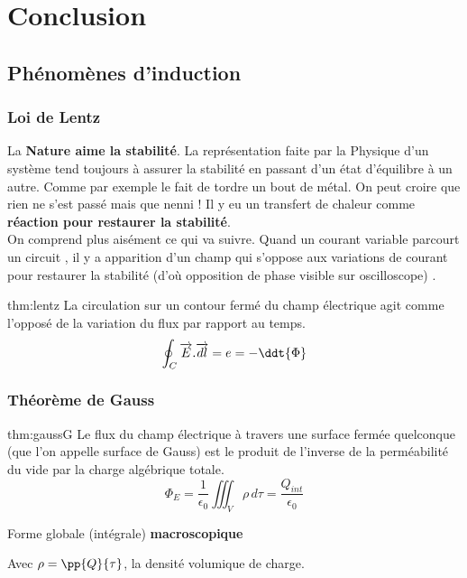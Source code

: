 \section{Conclusion}

\subsection{Phénomènes d'induction}
\subsubsection{Loi de Lentz}
    La \textbf{Nature aime la stabilité}. La représentation faite par la Physique d’un
    système tend toujours à assurer la stabilité en passant d’un état d’équilibre
    à un autre. Comme par exemple le fait de tordre un bout de métal. On peut
    croire que rien ne s’est passé mais que nenni ! Il y eu un transfert de chaleur
    comme \textbf{réaction pour restaurer la stabilité}. \\
    On comprend plus aisément ce qui va suivre. Quand un courant variable parcourt un circuit , il y a apparition d’un champ qui s’oppose aux variations de
    courant pour restaurer la stabilité (d’où opposition de phase visible sur oscilloscope) .

    \begin{theo}{thm:lentz}
        La circulation sur un contour fermé du champ électrique agit comme l'opposé de la variation du flux par rapport au temps.
        \[
        \oint_C \overrightarrow{E}.\overrightarrow{dl} = e = - \ddt{\Phi}
        \]
    \end{theo}

\subsubsection{Théorème de Gauss}
    \begin{theo}{thm:gaussG}
        Le flux du champ électrique à travers une surface fermée quelconque (que l’on
    appelle surface de Gauss) est le produit de l’inverse de la perméabilité du vide par
    la charge algébrique totale.
        \[
        \Phi_E = \frac{1}{\epsilon_0} \iiint_V \rho \,d\tau = \frac{Q_{int}}{\epsilon_0}
        \]
        \begin{center}
            Forme globale (intégrale) \textbf{macroscopique}
        \end{center}
    Avec $\rho = \pp{Q}{\tau}$, la densité volumique de charge.
    \end{theo}

